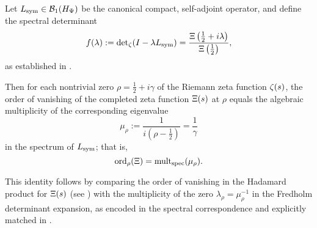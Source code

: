 \begin{lemma}
\label{lem:hadamard_fredholm_multiplicity}
Let \( L_{\mathrm{sym}} \in \mathcal{B}_1(H_{\Psi}) \) be the canonical compact, self-adjoint operator, and define the spectral determinant
\[
f(\lambda) := \det\nolimits_\zeta(I - \lambda L_{\mathrm{sym}}) = \frac{\Xi\left(\tfrac{1}{2} + i\lambda\right)}{\Xi\left(\tfrac{1}{2}\right)},
\]
as established in .

Then for each nontrivial zero \( \rho = \tfrac{1}{2} + i\gamma \) of the Riemann zeta function \( \zeta(s) \), the order of vanishing of the completed zeta function \( \Xi(s) \) at \( \rho \) equals the algebraic multiplicity of the corresponding eigenvalue
\[
\mu_\rho := \frac{1}{i(\rho - \tfrac{1}{2})} = \frac{1}{\gamma}
\]
in the spectrum of \( L_{\mathrm{sym}} \); that is,
\[
\operatorname{ord}_\rho(\Xi) = \operatorname{mult}_{\mathrm{spec}}(\mu_\rho).
\]

\medskip
\noindent
This identity follows by comparing the order of vanishing in the Hadamard product for \( \Xi(s) \) (see ) with the multiplicity of the zero \( \lambda_\rho = \mu_\rho^{-1} \) in the Fredholm determinant expansion, as encoded in the spectral correspondence  and explicitly matched in .
\end{lemma}
